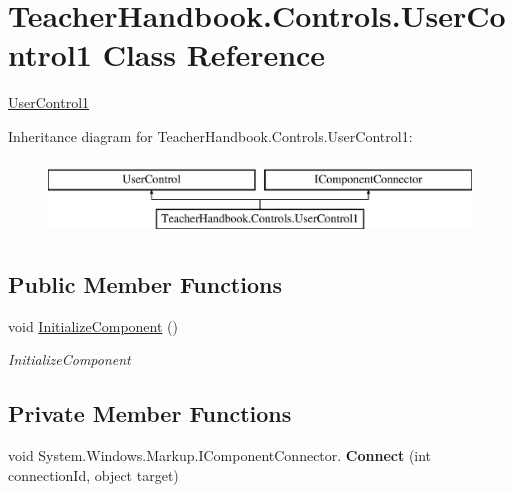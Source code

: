 \hypertarget{class_teacher_handbook_1_1_controls_1_1_user_control1}{}\section{Teacher\+Handbook.\+Controls.\+User\+Control1 Class Reference}
\label{class_teacher_handbook_1_1_controls_1_1_user_control1}


\mbox{\hyperlink{class_teacher_handbook_1_1_controls_1_1_user_control1}{User\+Control1}}  


Inheritance diagram for Teacher\+Handbook.\+Controls.\+User\+Control1\+:\begin{figure}[H]
\begin{center}
\leavevmode
\includegraphics[height=2.000000cm]{d6/dc1/class_teacher_handbook_1_1_controls_1_1_user_control1}
\end{center}
\end{figure}
\subsection*{Public Member Functions}
\begin{DoxyCompactItemize}
\item 
void \mbox{\hyperlink{class_teacher_handbook_1_1_controls_1_1_user_control1_afbcb7046a6000b1f69c161bb9e5c69b2}{Initialize\+Component}} ()
\begin{DoxyCompactList}\small\item\em Initialize\+Component \end{DoxyCompactList}\end{DoxyCompactItemize}
\subsection*{Private Member Functions}
\begin{DoxyCompactItemize}
\item 
\mbox{\label{class_teacher_handbook_1_1_controls_1_1_user_control1_ae5076c67f52166ebffbcdd33f5270a6c}} 
void System.\+Windows.\+Markup.\+I\+Component\+Connector. {\bfseries Connect} (int connection\+Id, object target)
\end{DoxyCompactItemize}

